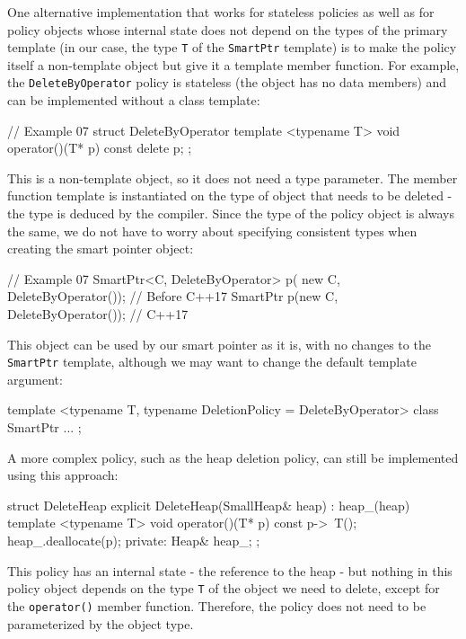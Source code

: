 One alternative implementation that works for stateless policies as well as for policy objects whose internal state does not depend on the types of the primary template (in our case, the type \texttt{T} of the \texttt{SmartPtr} template) is to make the policy itself a non-template object but give it a template member function. For example, the \texttt{DeleteByOperator} policy is stateless (the object has no data members) and can be implemented without a class template:

\begin{code}
// Example 07
struct DeleteByOperator {
  template <typename T> void operator()(T* p) const {
    delete p;
  }
};
\end{code}

This is a non-template object, so it does not need a type parameter. The member function template is instantiated on the type of object that needs to be deleted - the type is deduced by the compiler. Since the type of the policy object is always the same, we do not have to worry about specifying consistent types when creating the smart pointer object:

\begin{code}
// Example 07
SmartPtr<C, DeleteByOperator> p(
  new C, DeleteByOperator());             // Before C++17
SmartPtr p(new C, DeleteByOperator());     // C++17
\end{code}

This object can be used by our smart pointer as it is, with no changes to the \texttt{SmartPtr} template, although we may want to change the default template argument:

\begin{code}
template <typename T,
          typename DeletionPolicy = DeleteByOperator>
class SmartPtr { ... };
\end{code}

A more complex policy, such as the heap deletion policy, can still be implemented using this approach:

\begin{code}
struct DeleteHeap {
  explicit DeleteHeap(SmallHeap& heap) : heap_(heap) {}
  template <typename T> void operator()(T* p) const {
    p->~T();
    heap_.deallocate(p);
  }
  private:
  Heap& heap_;
};
\end{code}

This policy has an internal state - the reference to the heap - but nothing in this policy object depends on the type \texttt{T} of the object we need to delete, except for the \texttt{operator()} member function. Therefore, the policy does not need to be parameterized by the object type.

